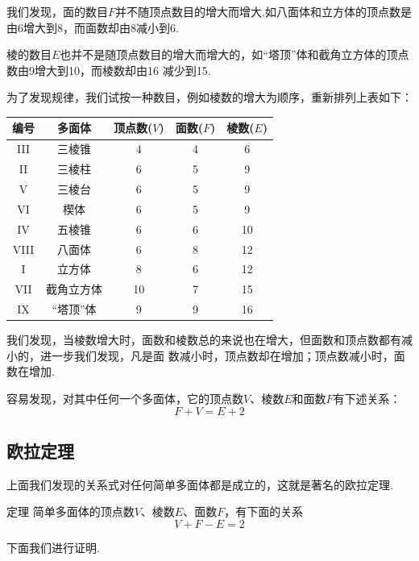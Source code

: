 我们发现，面的数目$F$并不随顶点数目的增大而增大.如八面体和立方体的顶点数是由6增大到8，而面数却由8减小到6.

棱的数目$E$也并不是随顶点数目的增大而增大的，如“塔顶”体和截角立方体的顶点数由9增大到10，而棱数却由16
减少到15.

为了发现规律，我们试按一种数目，例如棱数的增大为顺序，重新排列上表如下：

\begin{center}
  \begin{tabular}{ccccc}
    \hline
编号&	多面体&	顶点数($V$)&	面数($F$)&	棱数($E$)\\
    \hline
III	&三棱锥&	4&	4	&6\\
II	&三棱柱&	6&	5	&9\\
V	&三棱台&	6&	5&	9\\
VI	&楔体 &	6 &	5	&9\\
IV	&五棱锥&	6&	6	&10\\
VIII	&八面体&	6&	8	&12\\
I	&立方体&	8&	6	&12\\
VII	&截角立方体&	10&	7&	15\\
IX	&“塔顶”体&	9	&9	&16\\
\hline
\end{tabular}  
\end{center}


我们发现，当棱数增大时，面数和棱数总的来说也在增大，但面数和顶点数都有减小的，进一步我们发现，凡是面
数减小时，顶点数却在增加；顶点数减小时，面数在增加.

容易发现，对其中任何一个多面体，它的顶点数$V$、棱数$E$和面数$F$有下述关系：
\[
F+V=E+2\]

\subsection{欧拉定理}

上面我们发现的关系式对任何简单多面体都是成立的，这就是著名的欧拉定理.
\begin{thm}
{定理} 简单多面体的顶点数$V$、棱数$E$、面数$F$，有下面的关系
\[
V+F-E=2\]
\end{thm}


下面我们进行证明.

